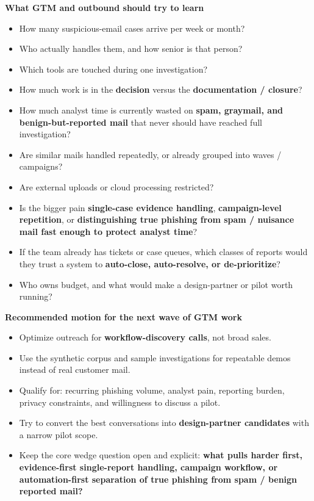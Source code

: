 \documentclass[10pt,a4paper]{article}
\begin{document}
\noindent\textbf{What GTM and outbound should try to learn}
\begin{itemize}
  \item How many suspicious-email cases arrive per week or month?
  \item Who actually handles them, and how senior is that person?
  \item Which tools are touched during one investigation?
  \item How much work is in the \textbf{decision} versus the \textbf{documentation / closure}?
  \item How much analyst time is currently wasted on \textbf{spam, graymail, and benign-but-reported mail} that never should have reached full investigation?
  \item Are similar mails handled repeatedly, or already grouped into waves / campaigns?
  \item Are external uploads or cloud processing restricted?
  \item Is the bigger pain \textbf{single-case evidence handling}, \textbf{campaign-level repetition}, or \textbf{distinguishing true phishing from spam / nuisance mail fast enough to protect analyst time}?
  \item If the team already has tickets or case queues, which classes of reports would they trust a system to \textbf{auto-close, auto-resolve, or de-prioritize}?
  \item Who owns budget, and what would make a design-partner or pilot worth running?
\end{itemize}

\noindent\textbf{Recommended motion for the next wave of GTM work}
\begin{itemize}
  \item Optimize outreach for \textbf{workflow-discovery calls}, not broad sales.
  \item Use the synthetic corpus and sample investigations for repeatable demos instead of real customer mail.
  \item Qualify for: recurring phishing volume, analyst pain, reporting burden, privacy constraints, and willingness to discuss a pilot.
  \item Try to convert the best conversations into \textbf{design-partner candidates} with a narrow pilot scope.
  \item Keep the core wedge question open and explicit: \textbf{what pulls harder first, evidence-first single-report handling, campaign workflow, or automation-first separation of true phishing from spam / benign reported mail?}
\end{itemize}
\end{document}
